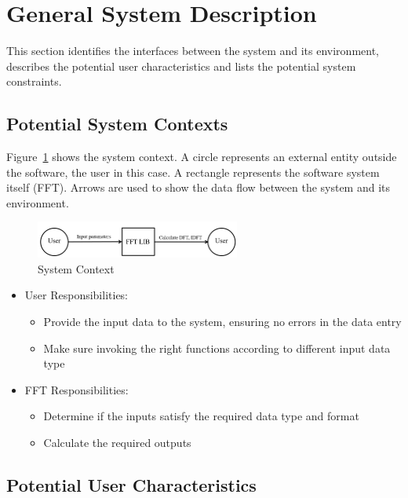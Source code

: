 \documentclass[12pt]{article}
\newcommand{\famname}{FFT} %
\begin{document}
\section{General System Description}

This section identifies the interfaces between the system and its environment,
describes the potential user characteristics and lists the potential system
constraints.

\subsection{Potential System Contexts}
Figure~\ref{Fig_SystemContext} shows the system context.  A circle represents an
external entity outside the software, the user in this case.  A rectangle
represents the software system itself (\famname{}).  Arrows are used to show the data
flow between the system and its environment.\\


\begin{figure}[h!]
\begin{center}
 \includegraphics[width=0.6\textwidth]{SystemContextFigure}
\caption{System Context}
\label{Fig_SystemContext} 
\end{center}
\end{figure}

\begin{itemize}
\item User Responsibilities:
\begin{itemize}
\item  Provide the input data to the system, ensuring no errors in the data entry
\item  Make sure invoking the right functions according to different input data type
\end{itemize}
\item \famname{} Responsibilities:
\begin{itemize}
\item Determine if the inputs satisfy the required data type and format
\item Calculate the required outputs
\end{itemize}
\end{itemize}

\subsection{Potential User Characteristics} \label{SecUserCharacteristics}
\end{document}
